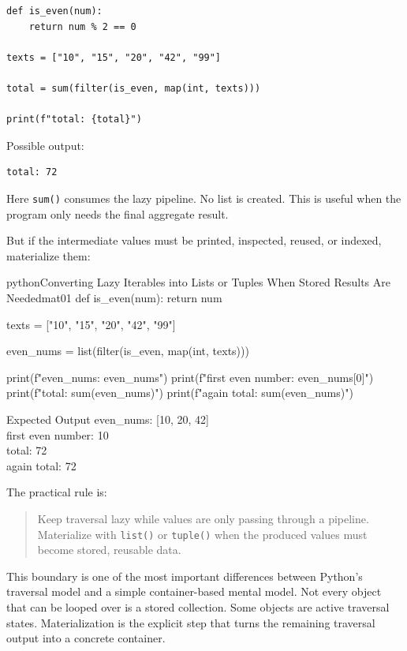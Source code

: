 \documentclass[a4paper,twoside]{report}
\begin{document}
\begin{verbatim}
def is_even(num):
    return num % 2 == 0

texts = ["10", "15", "20", "42", "99"]

total = sum(filter(is_even, map(int, texts)))

print(f"total: {total}")
\end{verbatim}

Possible output:

\begin{verbatim}
total: 72
\end{verbatim}

Here \texttt{sum()} consumes the lazy pipeline. No list is created. This is useful when the program only needs the final aggregate result.

But if the intermediate values must be printed, inspected, reused, or indexed, materialize them:

\begin{codebox}[]{python}{Converting Lazy Iterables into Lists or Tuples When Stored Results Are Needed}{mat01}
def is_even(num):
    return num %

texts = ["10", "15", "20", "42", "99"]

even_nums = list(filter(is_even, map(int, texts)))

print(f"even_nums: {even_nums}")
print(f"first even number: {even_nums[0]}")
print(f"total: {sum(even_nums)}")
print(f"again total: {sum(even_nums)}")
\end{codebox}


\begin{iobox}{Expected Output}
even\_nums: [10, 20, 42] \\
first even number: 10 \\
total: 72 \\
again total: 72 \\
\end{iobox}




The practical rule is:

\begin{quote}
Keep traversal lazy while values are only passing through a pipeline. Materialize with \texttt{list()} or \texttt{tuple()} when the produced values must become stored, reusable data.
\end{quote}

This boundary is one of the most important differences between Python's traversal model and a simple container-based mental model. Not every object that can be looped over is a stored collection. Some objects are active traversal states. Materialization is the explicit step that turns the remaining traversal output into a concrete container.
\end{document}
